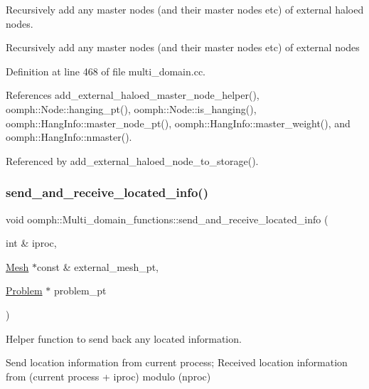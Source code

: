 Recursively add any master nodes (and their master nodes etc) of external haloed nodes. 

Recursively add any master nodes (and their master nodes etc) of external nodes 

Definition at line 468 of file multi\+\_\+domain.\+cc.



References add\+\_\+external\+\_\+haloed\+\_\+master\+\_\+node\+\_\+helper(), oomph\+::\+Node\+::hanging\+\_\+pt(), oomph\+::\+Node\+::is\+\_\+hanging(), oomph\+::\+Hang\+Info\+::master\+\_\+node\+\_\+pt(), oomph\+::\+Hang\+Info\+::master\+\_\+weight(), and oomph\+::\+Hang\+Info\+::nmaster().



Referenced by add\+\_\+external\+\_\+haloed\+\_\+node\+\_\+to\+\_\+storage().

\mbox{\label{namespaceoomph_1_1Multi__domain__functions_a131c53d0a1557066df4719d24796b3a8}} 
\subsubsection{\texorpdfstring{send\+\_\+and\+\_\+receive\+\_\+located\+\_\+info()}{send\_and\_receive\_located\_info()}}
{\footnotesize\ttfamily void oomph\+::\+Multi\+\_\+domain\+\_\+functions\+::send\+\_\+and\+\_\+receive\+\_\+located\+\_\+info (\begin{DoxyParamCaption}\item[{int \&}]{iproc,  }\item[{\hyperlink{classoomph_1_1Mesh}{Mesh} $\ast$const \&}]{external\+\_\+mesh\+\_\+pt,  }\item[{\hyperlink{classoomph_1_1Problem}{Problem} $\ast$}]{problem\+\_\+pt }\end{DoxyParamCaption})}



Helper function to send back any located information. 

Send location information from current process; Received location information from (current process + iproc) modulo (nproc) 

